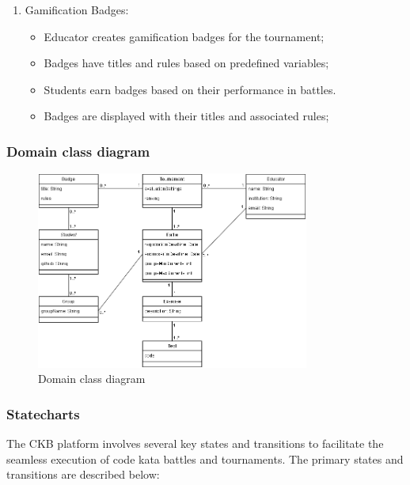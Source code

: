 \begin{enumerate}
    \item Gamification Badges:
        \begin{itemize}
            \item Educator creates gamification badges for the tournament;
            \item Badges have titles and rules based on predefined variables;
            \item Students earn badges based on their performance in battles.
            \item Badges are displayed with their titles and associated rules;
        \end{itemize}
    
\end{enumerate}

\subsubsection{Domain class diagram}

\begin{figure}[h!]
  \centering
  \includegraphics[width=0.8\textwidth]{Images/ClassDiagramRASD.png}
  \caption{Domain class diagram}
  \label{fig:ClassDiagram}
\end{figure}

\subsubsection{Statecharts}


The CKB platform involves several key states and transitions to facilitate the seamless execution of code kata battles and tournaments. The primary states and transitions are described below:

